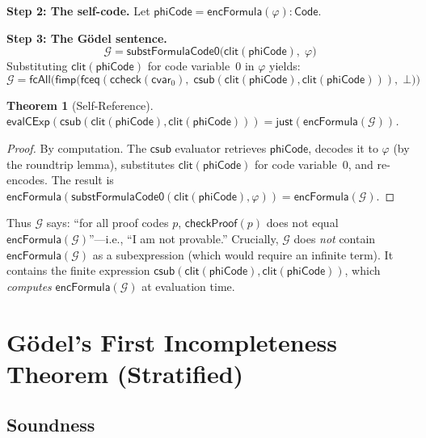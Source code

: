 \documentclass[11pt]{article}
\newtheorem{theorem}{Theorem}[section]
\newcommand{\Code}{\mathsf{Code}}
\newcommand{\evalCExp}{\mathsf{evalCExp}}
\newcommand{\checkProof}{\mathsf{checkProof}}
\newcommand{\encFormula}{\mathsf{encFormula}}
\newcommand{\substF}{\mathsf{substFormulaCode0}}
\newcommand{\csub}{\mathsf{csub}}
\newcommand{\clit}{\mathsf{clit}}
\newcommand{\ccheck}{\mathsf{ccheck}}
\newcommand{\cvar}{\mathsf{cvar}}
\newcommand{\fbot}{\bot}
\newcommand{\fimp}{\mathsf{fimp}}
\newcommand{\fceq}{\mathsf{fceq}}
\newcommand{\fcAll}{\mathsf{fcAll}}
\newcommand{\GS}{\mathcal{G}}
\newcommand{\phiCode}{\mathsf{phiCode}}
\begin{document}
\medskip
\noindent\textbf{Step 2: The self-code.}
Let $\phiCode = \encFormula(\varphi) : \Code$.

\medskip
\noindent\textbf{Step 3: The G\"odel sentence.}
\[
  \GS = \substF\bigl(\clit(\phiCode),\; \varphi\bigr)
\]
Substituting $\clit(\phiCode)$ for code variable~0 in $\varphi$ yields:
\[
  \GS = \fcAll\bigl(\fimp\bigl(
    \fceq(\ccheck(\cvar_0),\; \csub(\clit(\phiCode), \clit(\phiCode))),\;
    \fbot\bigr)\bigr)
\]

\begin{theorem}[Self-Reference]
  \label{thm:selfref}
  $\evalCExp(\csub(\clit(\phiCode), \clit(\phiCode)))
    = \mathsf{just}(\encFormula(\GS))$.
\end{theorem}

\begin{proof}
  By computation. The $\csub$ evaluator retrieves $\phiCode$, decodes it
  to $\varphi$ (by the roundtrip lemma), substitutes $\clit(\phiCode)$
  for code variable~0, and re-encodes. The result is
  $\encFormula(\substF(\clit(\phiCode), \varphi)) = \encFormula(\GS)$.
\end{proof}

Thus $\GS$ says: ``for all proof codes $p$, $\checkProof(p)$ does not
equal $\encFormula(\GS)$''---i.e., ``I am not provable.'' Crucially,
$\GS$ does \emph{not} contain $\encFormula(\GS)$ as a subexpression
(which would require an infinite term). It contains the finite expression
$\csub(\clit(\phiCode), \clit(\phiCode))$, which \emph{computes}
$\encFormula(\GS)$ at evaluation time.

\section{G\"odel's First Incompleteness Theorem (Stratified)}
\label{sec:goedel1}

\subsection{Soundness}
\end{document}
